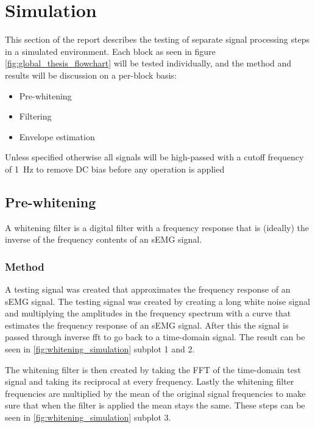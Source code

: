 \chapter{Simulation}
This section of the report describes the testing of separate signal processing steps in a simulated environment. Each block as seen in figure \ref{fig:global_thesis_flowchart} will be tested individually, and the method and results will be discussion on a per-block basis:
\begin{itemize}
    \item Pre-whitening
    \item Filtering
    \item Envelope estimation
\end{itemize}

Unless specified otherwise all signals will be high-passed with a cutoff frequency of \SI{1}{\hertz} to remove DC bias before any operation is applied

\section{Pre-whitening}
A whitening filter is a digital filter with a frequency response that is (ideally) the inverse of the frequency contents of an sEMG signal. 

\subsection{Method}
A testing signal was created that approximates the frequency response of an sEMG signal. The testing signal was created by creating a long white noise signal and multiplying the amplitudes in the frequency spectrum with a curve that estimates the frequency response of an sEMG signal. After this the signal is passed through inverse fft to go back to a time-domain signal. The result can be seen in \ref{fig:whitening_simulation} subplot 1 and 2.

The whitening filter is then created by taking the FFT of the time-domain test signal and taking its reciprocal at every frequency. Lastly the whitening filter frequencies are multiplied by the mean of the original signal frequencies to make sure that when the filter is applied the mean stays the same. These steps can be seen in \ref{fig:whitening_simulation} subplot 3. 

